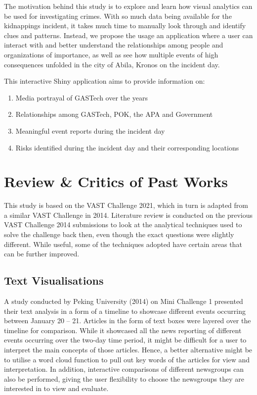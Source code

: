 \documentclass{acm_proc_article-sp}
\providecommand{\tightlist}{%
  \setlength{\itemsep}{0pt}\setlength{\parskip}{0pt}}
\begin{document}
The motivation behind this study is to explore and learn how visual
analytics can be used for investigating crimes. With so much data being
available for the kidnappings incident, it takes much time to manually
look through and identify clues and patterns. Instead, we propose the
usage an application where a user can interact with and better
understand the relationships among people and organizations of
importance, as well as see how multiple events of high consequences
unfolded in the city of Abila, Kronos on the incident day.

This interactive Shiny application aims to provide information on:

\begin{enumerate}
\def\labelenumi{\arabic{enumi}.}
\tightlist
\item
  Media portrayal of GASTech over the years
\item
  Relationships among GASTech, POK, the APA and Government
\item
  Meaningful event reports during the incident day
\item
  Risks identified during the incident day and their corresponding
  locations
\end{enumerate}

\hypertarget{review-critics-of-past-works}{%
\section{Review \& Critics of Past
Works}\label{review-critics-of-past-works}}

This study is based on the VAST Challenge 2021, which in turn is adapted
from a similar VAST Challenge in 2014. Literature review is conducted on
the previous VAST Challenge 2014 submissions to look at the analytical
techniques used to solve the challenge back then, even though the exact
questions were slightly different. While useful, some of the techniques
adopted have certain areas that can be further improved.

\hypertarget{text-visualisations}{%
\subsection{Text Visualisations}\label{text-visualisations}}

A study conducted by Peking University (2014) on Mini Challenge 1
presented their text analysis in a form of a timeline to showcase
different events occurring between January 20 -- 21. Articles in the
form of text boxes were layered over the timeline for comparison. While
it showcased all the news reporting of different events occurring over
the two-day time period, it might be difficult for a user to interpret
the main concepts of those articles. Hence, a better alternative might
be to utilise a word cloud function to pull out key words of the
articles for view and interpretation. In addition, interactive
comparisons of different newsgroups can also be performed, giving the
user flexibility to choose the newsgroups they are interested in to view
and evaluate.
\end{document}
